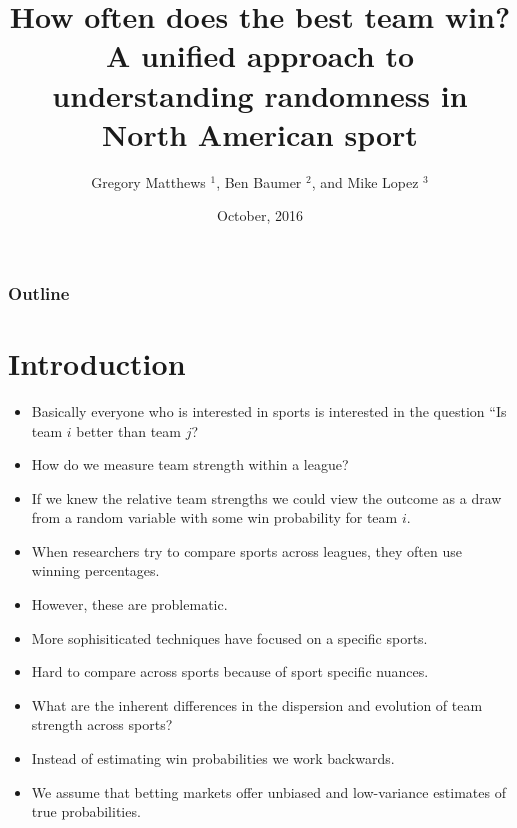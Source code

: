 \documentclass{beamer}\usepackage[]{graphicx}\usepackage[]{color}
\title{How often does the best team win? A unified approach
to understanding randomness in North American sport}
\author{Gregory Matthews $^{1}$, Ben Baumer $^{2}$, and Mike Lopez $^{3}$ }
\institute [Loyola] %
{
  $^{1}$Loyola University Chicago\\
  
  
  $^{2}$Smith College\\
  
  
  $^{3}$Skidmore College\\
  
}
\date[October 2016] %
{October, 2016} %
\begin{document}

\begin{frame}
  \titlepage
\end{frame}

\begin{frame}
  \frametitle{Outline}
  \tableofcontents
\end{frame}


\section{Introduction}

\begin{frame}{}
\begin{itemize}
\item Basically everyone who is interested in sports is interested in the question ``Is team $i$ better than team $j$?  
\item How do we measure team strength within a league?
\item If we knew the relative team strengths we could view the outcome as a draw from a random variable with some win probability for team $i$. 
\end{itemize}
\end{frame}

\begin{frame}{}
\begin{itemize}
\item When researchers try to compare sports across leagues, they often use winning percentages.  
\item However, these are problematic.  
\item More sophisiticated techniques have focused on a specific sports. 
\item Hard to compare across sports because of sport specific nuances.  
\item What are the inherent differences in the dispersion and evolution of team strength across sports? 
\end{itemize}
\end{frame}

\begin{frame}{}
\begin{itemize}
\item Instead of estimating win probabilities we work backwards.  
\item We assume that betting markets offer unbiased and low-variance estimates of true probabilities.  
\end{itemize}
\end{frame}
\end{document}
